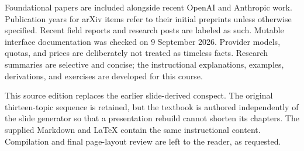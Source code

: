 Foundational papers are included alongside recent OpenAI and Anthropic work. Publication years for arXiv items refer to their initial preprints unless otherwise specified. Recent field reports and research posts are labeled as such. Mutable interface documentation was checked on 9 September 2026. Provider models, quotas, and prices are deliberately not treated as timeless facts. Research summaries are selective and concise; the instructional explanations, examples, derivations, and exercises are developed for this course.

This source edition replaces the earlier slide-derived conspect. The original thirteen-topic sequence is retained, but the textbook is authored independently of the slide generator so that a presentation rebuild cannot shorten its chapters. The supplied Markdown and LaTeX contain the same instructional content. Compilation and final page-layout review are left to the reader, as requested.


